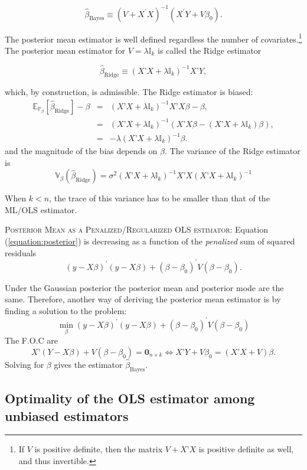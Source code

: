 \documentclass[11pt]{article} %
\begin{document}
\[ \widehat{\beta}_{\textrm{Bayes}} \equiv \left( V + X^{\prime} X \right)^{-1} \left( X^{\prime} Y + V \beta_0 \right). \]

\noindent The posterior mean estimator is well defined regardless the number of covariates.\footnote{If $V$ is positive definite, then the matrix $V+ X’X$ is positive definite as well, and thus invertible.} The posterior mean estimator for $V= \lambda \mathbb{I}_{k}$ is called the Ridge estimator

\[  \widehat{\beta}_{\textrm{Ridge}} \equiv (X’X + \lambda \mathbb{I}_{k})^{-1} X’Y, \]

\noindent which, by construction, is admissible. The Ridge estimator is biased:
\begin{eqnarray*}
\mathbb{E}_{\mathbb{P}_{\beta}} [ \widehat{\beta}_{\textrm{Ridge}} ] - \beta &=& (X’X + \lambda \mathbb{I}_{k})^{-1} X’X\beta - \beta,  \\
&=& (X’X + \lambda \mathbb{I}_{k})^{-1} (X’X\beta - (X’X + \lambda \mathbb{I}_{k}) \beta), \\
&=& -\lambda (X’X + \lambda \mathbb{I}_k)^{-1} \beta.
\end{eqnarray*}
\noindent and the magnitude of the bias depends on $\beta$. The variance of the Ridge estimator is
\[ \mathbb{V}_{\beta} (\widehat{\beta}_{\textrm{Ridge}}) = \sigma^2( X’X + \lambda \mathbb{I}_k)^{-1} X’X ( X’X + \lambda \mathbb{I}_k)^{-1}  \]

\noindent When $k<n$, the trace of this variance has to be smaller than that of the ML/OLS estimator.

{\scshape Posterior Mean as a Penalized/Regularized OLS estimator:} \noindent Equation (\ref{equation:posterior}) is decreasing as a function of the \emph{penalized} sum of squared residuals 
\[ (y-X\beta)^{\prime} (y-X \beta) + (\beta-\beta_0)^{\prime} V (\beta-\beta_0). \]


\noindent Under the Gaussian posterior the posterior mean and posterior mode are the same. Therefore, another way of deriving the posterior mean estimator is by finding a solution to the problem:
\[ \min_{\beta} (y-X\beta)^{\prime} (y-X \beta) + (\beta-\beta_0)^{\prime} V (\beta-\beta_0) \]
The F.O.C are 
\[ X’(Y-X\beta) + V(\beta - \beta_0) = \textbf{0}_{n \times k} \iff  X’Y + V \beta_0 = (X’X + V) \beta. \]
\noindent Solving for $\beta$ gives the estimator $\widehat{\beta}_{\textrm{Bayes}}$. 

\subsection{Optimality of the OLS estimator among unbiased estimators}
\end{document}
